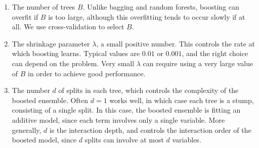\begin{enumerate}
    \item The number of trees $B$. Unlike bagging and random forests, boosting can overfit if $B$ is
too large, although this overfitting tends to occur slowly if at all. We use cross-validation to
select $B$.
    \item The shrinkage parameter $\lambda$, a small positive number. This controls the rate at
which boosting learns. Typical values are $0.01$ or $0.001$, and the right choice can depend on
the problem. Very small $\lambda$ can require using a very large value of $B$ in order to
achieve good performance.
    \item The number $d$ of splits in each tree, which controls the complexity of the boosted
ensemble. Often $d=1$ works well, in which case each tree is a stump, consisting of a single split.
In this case, the boosted ensemble is fitting an additive model, since each term involves only a
single variable. More generally, $d$ is the interaction depth, and controls the interaction order of
the boosted model, since $d$ splits can involve at most $d$ variables.
\end{enumerate}
